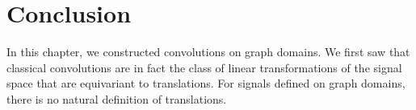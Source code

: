 \section{Conclusion}
\label{sec:2.5}

In this chapter, we constructed convolutions on graph domains.
We first saw that classical convolutions are in fact the class of linear transformations of the signal space that are equivariant to translations. For signals defined on graph domains, there is no natural definition of translations.
